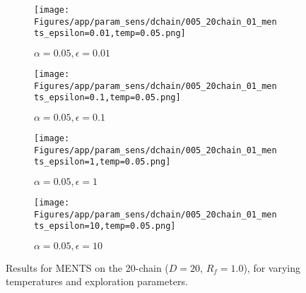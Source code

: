 \documentclass{article}
\theoremstyle{plain}
\begin{document}
\begin{appendices}
\begin{figure}
                \begin{subfigure}[b]{0.24\textwidth}
                    \centering
                    \texttt{[image: Figures/app/param\_sens/dchain/005\_20chain\_01\_ments\_epsilon=0.01,temp=0.05.png]}
                    \caption*{$\alpha=0.05,\epsilon=0.01$}
                \end{subfigure}
                \begin{subfigure}[b]{0.24\textwidth}
                    \centering
                    \texttt{[image: Figures/app/param\_sens/dchain/005\_20chain\_01\_ments\_epsilon=0.1,temp=0.05.png]}
                    \caption*{$\alpha=0.05,\epsilon=0.1$}
                \end{subfigure}
                \begin{subfigure}[b]{0.24\textwidth}
                    \centering
                    \texttt{[image: Figures/app/param\_sens/dchain/005\_20chain\_01\_ments\_epsilon=1,temp=0.05.png]}
                    \caption*{$\alpha=0.05,\epsilon=1$}
                \end{subfigure}
                \begin{subfigure}[b]{0.24\textwidth}
                    \centering
                    \texttt{[image: Figures/app/param\_sens/dchain/005\_20chain\_01\_ments\_epsilon=10,temp=0.05.png]}
                    \caption*{$\alpha=0.05,\epsilon=10$}
                \end{subfigure}
                
                \caption{Results for MENTS on the 20-chain ($D=20$, $R_f=1.0$), for varying temperatures and exploration parameters.}
                \label{fig:ments_20chain_hps}
            \end{figure}


            \begin{figure}
                \centering
                

\end{figure}
\end{appendices}
\end{document}
